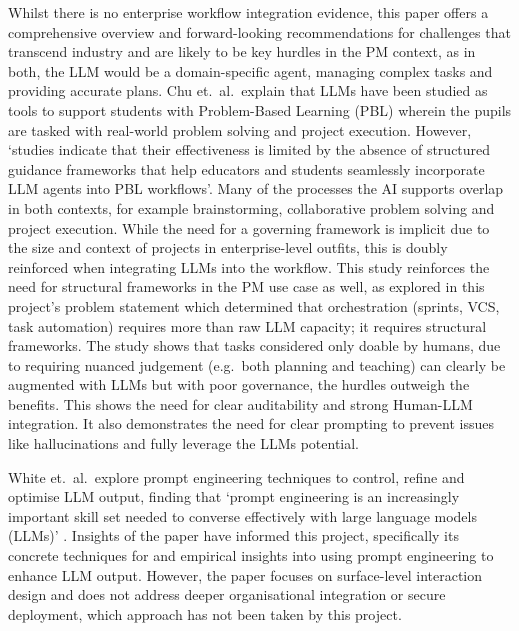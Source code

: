 \documentclass{report}
\begin{document}
Whilst there is no enterprise workflow integration evidence, this paper offers a comprehensive overview and forward-looking recommendations for challenges that transcend industry and are likely to be key hurdles in the PM context, as in both, the LLM would be a domain-specific agent, managing complex tasks and providing accurate plans. 
Chu et.\ al.\ explain that LLMs have been studied as tools to support students with Problem-Based Learning (PBL) wherein the pupils are tasked with real-world problem solving and project execution. 
However, `studies indicate that their effectiveness is limited by the absence of structured guidance frameworks that help educators and students seamlessly incorporate LLM agents into PBL workflows'. 
Many of the processes the AI supports overlap in both contexts, for example brainstorming, collaborative problem solving and project execution. 
While the need for a governing framework is implicit due to the size and context of projects in enterprise-level outfits, this is doubly reinforced when integrating LLMs into the workflow. 
This study reinforces the need for structural frameworks in the PM use case as well, as explored in this project's problem statement which determined that orchestration (sprints, VCS, task automation) requires more than raw LLM capacity; it requires structural frameworks. 
The study shows that tasks considered only doable by humans, due to requiring nuanced judgement (e.g.\ both planning and teaching) can clearly be augmented with LLMs but with poor governance, the hurdles outweigh the benefits. 
This shows the need for clear auditability and strong Human-LLM integration. 
It also demonstrates the need for clear prompting to prevent issues like hallucinations and fully leverage the LLMs potential.

White et.\ al.\ explore prompt engineering techniques to control, refine and optimise LLM output, finding that `prompt engineering is an increasingly important skill set needed to converse effectively with large language models (LLMs)' \parencite{whitePromptPatternCatalog2023}. 
Insights of the paper have informed this project, specifically its concrete techniques for and empirical insights into using prompt engineering to enhance LLM output. 
However, the paper focuses on surface-level interaction design and does not address deeper organisational integration or secure deployment, which approach has not been taken by this project. 
\end{document}
